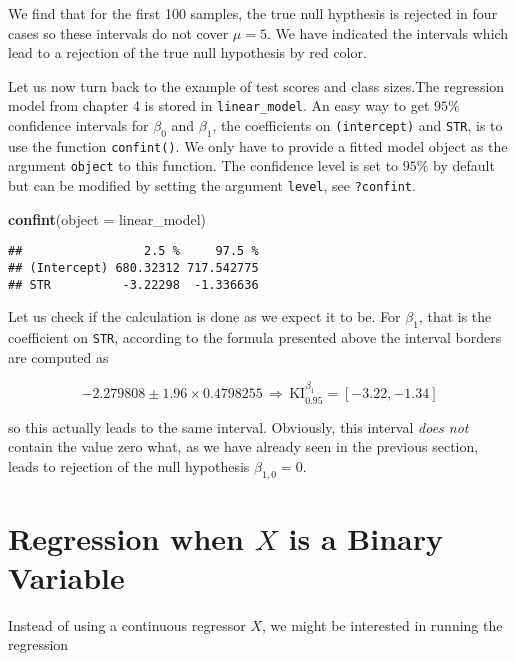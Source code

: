 \documentclass[]{book}
\newenvironment{Shaded}{\begin{snugshade}}{\end{snugshade}}
\newcommand{\KeywordTok}[1]{\textcolor[rgb]{0.13,0.29,0.53}{\textbf{#1}}}
\newcommand{\DataTypeTok}[1]{\textcolor[rgb]{0.13,0.29,0.53}{#1}}
\newcommand{\NormalTok}[1]{#1}
\theoremstyle{definition}
\theoremstyle{definition}
\theoremstyle{definition}
\theoremstyle{remark}
\begin{document}
We find that for the first 100 samples, the true null hypthesis is
rejected in four cases so these intervals do not cover \(\mu=5\). We
have indicated the intervals which lead to a rejection of the true null
hypothesis by red color.

Let us now turn back to the example of test scores and class sizes.The
regression model from chapter 4 is stored in \texttt{linear\_model}. An
easy way to get \(95\%\) confidence intervals for \(\beta_0\) and
\(\beta_1\), the coefficients on \texttt{(intercept)} and \texttt{STR},
is to use the function \texttt{confint()}. We only have to provide a
fitted model object as the argument \texttt{object} to this function.
The confidence level is set to \(95\%\) by default but can be modified
by setting the argument \texttt{level}, see \texttt{?confint}.

\begin{Shaded}
\begin{Highlighting}[]
\KeywordTok{confint}\NormalTok{(}\DataTypeTok{object =}\NormalTok{ linear_model)}
\end{Highlighting}
\end{Shaded}

\begin{verbatim}
##                 2.5 %     97.5 %
## (Intercept) 680.32312 717.542775
## STR          -3.22298  -1.336636
\end{verbatim}

Let us check if the calculation is done as we expect it to be. For
\(\beta_1\), that is the coefficient on \texttt{STR}, according to the
formula presented above the interval borders are computed as

\[  -2.279808 \pm 1.96 \times 0.4798255 \, \Rightarrow \, \text{KI}_{0.95}^{\beta_1} = \left[ -3.22, -1.34 \right]  \]

so this actually leads to the same interval. Obviously, this interval
\emph{does not} contain the value zero what, as we have already seen in
the previous section, leads to rejection of the null hypothesis
\(\beta_{1,0} = 0\).

\section{\texorpdfstring{Regression when \(X\) is a Binary
Variable}{Regression when X is a Binary Variable}}\label{regression-when-x-is-a-binary-variable}

Instead of using a continuous regressor \(X\), we might be interested in
running the regression
\end{document}
